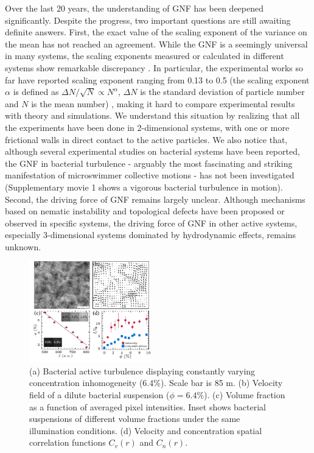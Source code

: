 \documentclass[twocolumn,aps,prl,amsmath,amssymb,longbibliography]{revtex4-2}
\begin{document}
Over the last 20 years, the understanding of GNF has been deepened significantly. Despite the progress, two important questions are still awaiting definite answers.
First, the exact value of the scaling exponent of the variance on the mean has not reached an agreement. While the GNF is a seemingly universal in many systems, the scaling exponents measured or calculated in different systems show remarkable discrepancy \cite{AditiSimha2002, Ramaswamy2003, Narayan2007, Chate2008, Deseigne2010, Zhang2010,
Dey2012, Saintillan2012, Schaller2013, Ngo2014, Nishiguchi2017, Kawaguchi2017, Mahault2019,
Karani2019}. In particular, the experimental works so far have reported scaling exponent ranging from 0.13 to 0.5 (the scaling exponent $\alpha$ is defined as $\Delta N /\sqrt N \propto N^\alpha$, $\Delta N$ is the standard deviation of particle number and $N$ is the mean number)
\cite{Narayan2007, Deseigne2010, Zhang2010, Schaller2013, Nishiguchi2017, Kawaguchi2017, Karani2019}, making it hard to compare experimental results with theory and simulations. We understand this situation by realizing that all the experiments have been done in 2-dimensional systems, with one or more frictional walls in direct contact to the active particles. We also notice that, although several experimental studies on bacterial systems have been reported, the GNF in bacterial turbulence - arguably the most fascinating and striking manifestation of microswimmer collective motions - has not been investigated (Supplementary movie 1 shows a vigorous bacterial turbulence in motion). Second, the driving force of GNF remains largely unclear. Although mechanisms based on nematic instability
\cite{AditiSimha2002, Ramaswamy2003, Narayan2007} and topological defects \cite{Saintillan2008b, Schaller2013} have been proposed or observed in specific systems, the driving force of GNF in other active systems, especially 3-dimensional systems dominated by hydrodynamic effects, remains unknown.


\begin{figure}[ht]
\begin{center}
\includegraphics[width=0.47\textwidth]{figures/experiment/v1.pdf}
\caption[Experimental details]
{
(a) Bacterial active turbulence displaying constantly varying concentration inhomogeneity (6.4\%). Scale bar is 85 \textmu m.
(b) Velocity field of a dilute bacterial suspension ($\phi=6.4\%$).
(c) Volume fraction as a function of averaged pixel intensities. Inset shows bacterial suspensions of different volume fractions under the same illumination conditions.
(d) Velocity and concentration spatial correlation functions $C_{v}(r)$ and $C_{n}(r)$.
}
\label{fig:experiment}
\end{center}
\end{figure}
\end{document}
